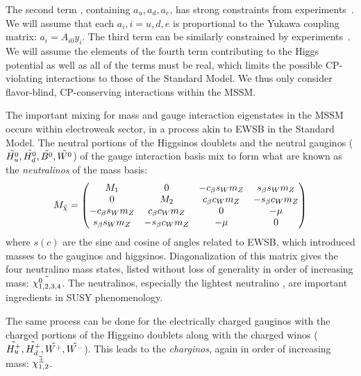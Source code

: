 The second term , containing $a_u,a_d,a_e$, has strong constraints from experiments~\cite{Hisano:1995nq,Gabbiani:1996hi}.
We will assume that each $a_i, i = u,d,e$ is proportional to the Yukawa coupling matrix: $a_i = A_{i0} y_i$.
The third term  can be similarly constrained by experiments~\cite{ Dimopoulos:1981zb, Gabbiani:1988rb, Hagelin:1992tc, Hagelin:1994id, Choudhury:1994pn, Barbieri:1994pv, deCarlos:1995ah, Casas:1996de,  Gabbiani:1996hi}.
We will assume the elements of the fourth term  contributing to the Higgs potential as well as all of the  terms must be real, which limits the possible CP-violating interactions to those of the Standard Model.
We thus only consider flavor-blind, CP-conserving interactions within the MSSM.

The important mixing for mass and gauge interaction eigenstates in the MSSM occurs within electroweak sector, in a process akin to EWSB in the Standard Model.
The neutral portions of the Higgsinos doublets and the neutral gauginos ($\tilde{H^0_u}, \tilde{H^0_d} ,\tilde{B^0}, \tilde{W^0}$) of the gauge interaction basis mix to form what are known as the \textit{neutralinos} of the mass basis:
\begin{equation}
M_{\tilde{\chi}}=
\begin{pmatrix}
M_1              & 0                & -c_\beta s_W m_Z & s_\beta s_W m_Z  \\
0                & M_2              & c_\beta c_W m_Z  & -s_\beta c_W m_Z \\
-c_\beta s_W m_Z & c_\beta c_W m_Z  & 0                & -\mu             \\
s_\beta s_W m_Z  & -s_\beta c_W m_Z & -\mu             & 0                \\
\end{pmatrix}
\end{equation}
where $s (c)$ are the sine and cosine of angles related to EWSB, which introduced masses to the gauginos and higgsinos.
Diagonalization of this matrix gives the four neutralino mass states, listed without loss of generality in order of increasing mass: $\tilde{\chi^0_{1,2,3,4}}$.
The neutralinos, especially the lightest neutralino \lsp, are important ingredients in SUSY phenomenology.

The same process can be done for the electrically charged gauginos with the charged portions of the Higgsino doublets along with the charged winos ($\tilde{H^+_u}, \tilde{H^+_d}, \tilde{W^+}, \tilde{W^-}$).
This leads to the \textit{charginos}, again in order of increasing mass: $\tilde{\chi_{1,2}^\pm}$.

